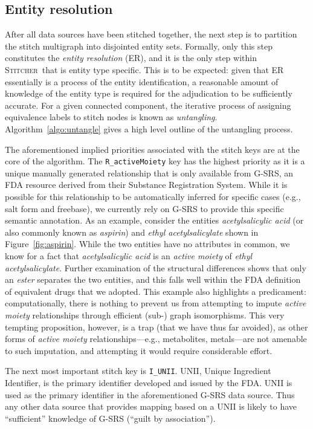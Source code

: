 \documentclass{bmcart}
\newcommand\st{\textsc{Stitcher}}
\begin{document}
\subsection*{Entity resolution}\label{sec:methods-er}
After all data sources have been stitched together, the next step is
to partition the stitch multigraph into disjointed entity sets.
Formally, only this step constitutes the \emph{entity resolution}
(ER), and it is the only step within \st\ that is entity type
specific. This is to be expected: given that ER essentially is a
process of the entity identification, a reasonable amount of knowledge
of the entity type is required for the adjudication to be sufficiently
accurate. For a given connected component, the iterative process of
assigning equivalence labels to stitch nodes is known as
\emph{untangling}. Algorithm~\ref{algo:untangle} gives a high level
outline of the untangling process. 

The aforementioned implied priorities associated with the stitch keys are 
at the core of the algorithm. The \texttt{R\_activeMoiety} key has the
highest priority as it is a unique manually generated relationship
that is only available from G-SRS, an FDA resource derived from their
Substance Registration System. While it is possible for this
relationship to be automatically inferred for specific cases (e.g.,
salt form and freebase), we currently rely on G-SRS to provide this
specific semantic annotation. As an example, consider the entities
\emph{acetylsalicylic acid} (or also commonly known as \emph{aspirin})
and \emph{ethyl acetylsalicylate} shown in Figure~\ref{fig:aspirin}.
While the two entities have no attributes in common, we know for a
fact that \emph{acetylsalicylic acid} is an \emph{active moiety} of
\emph{ethyl acetylsalicylate}. Further examination of the structural
differences shows that only an \emph{ester} separates the two
entities, and this falls well within the FDA definition of equivalent
drugs that we adopted. This example also highlights a predicament:
computationally, there is nothing to prevent us from attempting to
impute \emph{active moiety} relationships through efficient (sub-)
graph isomorphisms. This very tempting proposition, however, is a trap
(that we have thus far avoided), as other forms of \emph{active
  moiety} relationships---e.g., metabolites, metals---are not amenable
to such imputation, and attempting it would require considerable
effort. 

The next most important stitch key is \texttt{I\_UNII}. UNII, Unique
Ingredient Identifier, is the primary identifier developed and issued
by the FDA. UNII is used as the primary identifier in the
aforementioned G-SRS data source. Thus any other data source that
provides mapping based on a UNII is likely to have ``sufficient''
knowledge of G-SRS (``guilt by association'').
\end{document}
